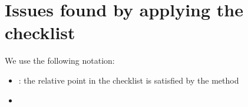 \section{Issues found by applying the checklist}
We use the following notation:
\begin{itemize}
	\item \cmark: the relative point in the checklist is satisfied by the method
	\item \xmark
\end{itemize}




















